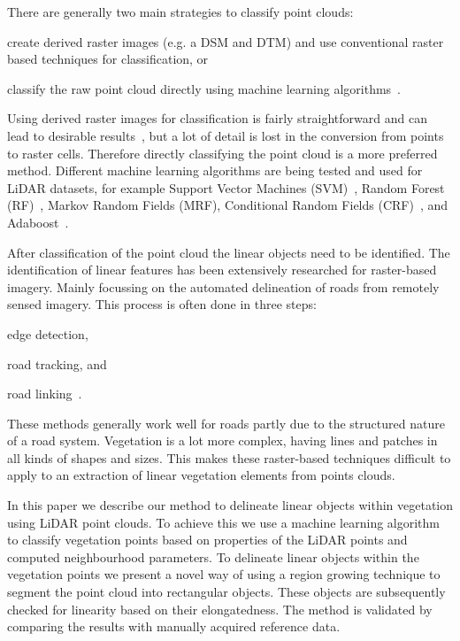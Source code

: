 There are generally two main strategies to classify point clouds:
\begin{enumerate*}[(i)]
	\item create derived raster images (e.g. a DSM and DTM) and use conventional raster based techniques for classification, or
	\item classify the raw point cloud directly using machine learning algorithms~\citep{yan2015urban}.
\end{enumerate*}
Using derived raster images for classification is fairly straightforward and can lead to desirable results~\citep{maas1999potential, charaniya2004supervised, brennan2006object, forlani2006complete, antonarakis2008object, im2008object}, but a lot of detail is lost in the conversion from points to raster cells. Therefore directly classifying the point cloud is a more preferred method. Different machine learning algorithms are being tested and used for LiDAR datasets, for example Support Vector Machines (SVM)~\citep{mallet2008analysis, zhang2013svm, weinmann2015semantic}, Random Forest (RF)~\citep{chehata2009airborne, guo2011relevance, niemeyer2014contextual, weinmann2014semantic, weinmann2015semantic}, Markov Random Fields (MRF), Conditional Random Fields (CRF)~\citep{niemeyer2011conditional, niemeyer2012conditional, niemeyer2014contextual}, and Adaboost~\citep{lodha2007aerial, weinmann2015semantic}.

\medskip

After classification of the point cloud the linear objects need to be identified. The identification of linear features has been extensively researched for raster-based imagery. Mainly focussing on the automated delineation of roads from remotely sensed imagery. This process is often done in three steps:
\begin{enumerate*}[(i)]
	\item edge detection,
	\item road tracking, and
	\item road linking~\citep{quackenbush2004review}.
\end{enumerate*}
These methods generally work well for roads partly due to the structured nature of a road system. Vegetation is a lot more complex, having lines and patches in all kinds of shapes and sizes. This makes these raster-based techniques difficult to apply to an extraction of linear vegetation elements from points clouds.

In this paper we describe our method to delineate linear objects within vegetation using LiDAR point clouds. To achieve this we use a machine learning algorithm to classify vegetation points based on properties of the LiDAR points and computed neighbourhood parameters. To delineate linear objects within the vegetation points we present a novel way of using a region growing technique to segment the point cloud into rectangular objects. These objects are subsequently checked for linearity based on their elongatedness. The method is validated by comparing the results with manually acquired reference data.
